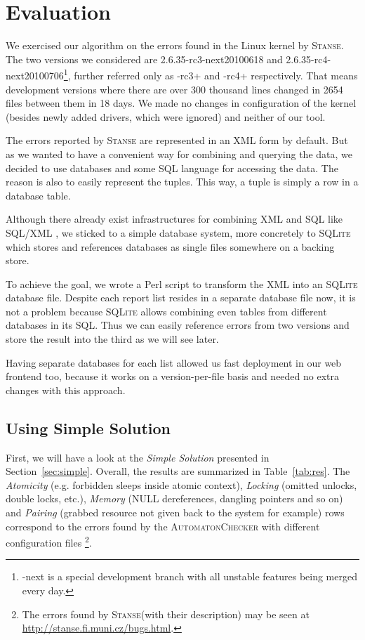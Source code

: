 \documentclass{acm_proc_article-sp}
\newcommand\st{\textsc{Stanse}\xspace}
\begin{document}
\section{Evaluation}
\label{sec:eval}
We exercised our algorithm on the errors found in the Linux kernel by \st. The
two versions we considered are 2.6.35-rc3-next20100618 and
2.6.35-rc4-next20100706\footnote{-next is a special development branch with
all unstable features being merged every day.}, further referred only as -rc3+
and -rc4+ respectively. That means development versions where there are over
300 thousand lines changed in 2654 files between them in 18 days. We made no
changes in configuration of the kernel (besides newly added drivers, which
were ignored) and neither of our tool.

The errors reported by \st are represented in an XML form by default. But as
we wanted to have a convenient way for combining and querying the data, we
decided to use databases and some SQL language for accessing the data. The
reason is also to easily represent the tuples. This way, a tuple is simply a
row in a database table.

Although there already exist infrastructures for combining XML and SQL like
SQL/XML \cite{sqlxml}, we sticked to a simple database system, more concretely
to \textsc{SQLite} \cite{sqlite} which stores and references databases as
single files somewhere on a backing store.

To achieve the goal, we wrote a Perl script to transform the XML into an
\textsc{SQLite} database file. Despite each report list resides in a separate
database file now, it is not a problem because \textsc{SQLite} allows
combining even tables from different databases in its SQL. Thus we can easily
reference errors from two versions and store the result into the third as we
will see later.

Having separate databases for each list allowed us fast deployment in our web
frontend too, because it works on a version-per-file basis and needed no
extra changes with this approach.

\subsection{Using Simple Solution}
First, we will have a look at the \emph{Simple Solution} presented in
Section~\ref{sec:simple}. Overall, the results are summarized in
Table~\ref{tab:res}. The \emph{Atomicity} (e.g. forbidden sleeps inside atomic
context), \emph{Locking} (omitted unlocks, double locks, etc.),
\emph{Memory} (NULL dereferences, dangling pointers and so on) and
\emph{Pairing} (grabbed resource not given back to the system for example)
rows correspond to the errors found by the
\textsc{AutomatonChecker} with different configuration files \footnote{The errors found by \st (with their
description) may be seen at \url{http://stanse.fi.muni.cz/bugs.html}.}.
\end{document}
